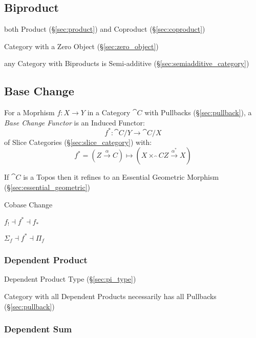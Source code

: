 \subsection{Biproduct}\label{sec:biproduct}

both Product (\S\ref{sec:product}) and Coproduct
(\S\ref{sec:coproduct})

Category with a Zero Object (\S\ref{sec:zero_object})

any Category with Biproducts is Semi-additive
(\S\ref{sec:semiadditive_category})



\subsection{Base Change}\label{sec:base_change}

For a Moprhism $f : X \rightarrow Y$ in a Category $\cat{C}$ with
Pullbacks (\S\ref{sec:pullback}), a \emph{Base Change Functor} is an
Induced Functor:
\[
  f^* : \cat{C}/Y \rightarrow \cat{C}/X
\]
of Slice Categories (\S\ref{sec:slice_category}) with:
\[
  f^* = (Z \xrightarrow{\alpha} C) \mapsto
    (X \times_\cat{C} Z \xrightarrow{\alpha^*} X)
\]

If $\cat{C}$ is a Topos then it refines to an Essential Geometric
Morphism (\S\ref{sec:essential_geometric})


Cobase Change

$f_! \dashv f^* \dashv f_*$

$\Sigma_f \dashv f^* \dashv \Pi_f$



\subsubsection{Dependent Product}\label{sec:dependent_product}

Dependent Product Type (\S\ref{sec:pi_type})

Category with all Dependent Products necessarily has all Pullbacks
(\S\ref{sec:pullback})



\subsubsection{Dependent Sum}\label{sec:dependent_sum}

